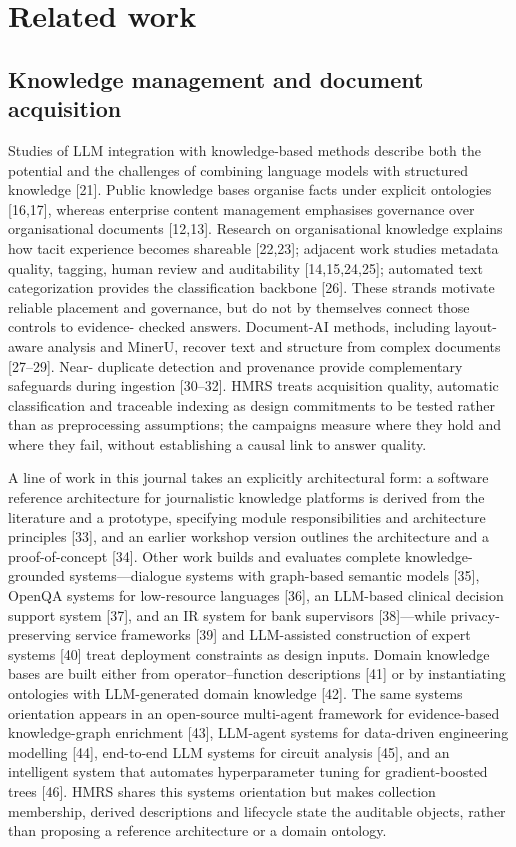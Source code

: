 \documentclass[11pt]{article}
\begin{document}
\section{Related work}


\subsection{Knowledge management and document acquisition}
Studies of LLM integration with knowledge-based methods describe both the
potential and the challenges of combining language models with structured
knowledge [21]. Public knowledge bases organise facts under explicit ontologies
[16,17], whereas enterprise content
management emphasises governance over organisational documents
[12,13]. Research on organisational
knowledge explains how tacit experience becomes shareable
[22,23]; adjacent work studies metadata
quality, tagging, human review and auditability
[14,15,24,25]; automated text categorization provides the classification backbone [26]. These strands motivate reliable placement
and governance, but do not by themselves connect those controls to evidence-
checked answers. Document-AI methods, including layout-aware analysis and
MinerU, recover text and structure from complex documents
[27--29]. Near-
duplicate detection and provenance provide complementary safeguards during
ingestion [30--32].
HMRS treats acquisition quality, automatic classification and traceable
indexing as design commitments to be tested rather than as preprocessing
assumptions; the campaigns measure where they hold and where they fail,
without establishing a causal link to answer quality.

A line of work in this journal takes an explicitly architectural form: a
software reference architecture for journalistic knowledge platforms is
derived from the literature and a prototype, specifying module
responsibilities and architecture principles [33], and an
earlier workshop version outlines the architecture and a proof-of-concept
[34]. Other work builds and evaluates complete
knowledge-grounded systems---dialogue systems with graph-based semantic
models [35], OpenQA systems for low-resource languages
[36], an LLM-based clinical decision support system
[37], and an IR system for bank supervisors
[38]---while privacy-preserving service frameworks
[39] and LLM-assisted construction of expert systems
[40] treat deployment constraints as design inputs.
Domain knowledge bases are built either from operator--function descriptions
[41] or by instantiating ontologies with LLM-generated domain
knowledge [42]. The same systems orientation appears in an
open-source multi-agent framework for evidence-based knowledge-graph enrichment
[43], LLM-agent systems for data-driven engineering
modelling [44], end-to-end LLM systems for circuit analysis
[45], and an intelligent system that automates
hyperparameter tuning for gradient-boosted trees [46].
HMRS shares this systems orientation but
makes collection membership, derived descriptions and lifecycle state the
auditable objects, rather than proposing a reference architecture or a domain
ontology.
\end{document}

